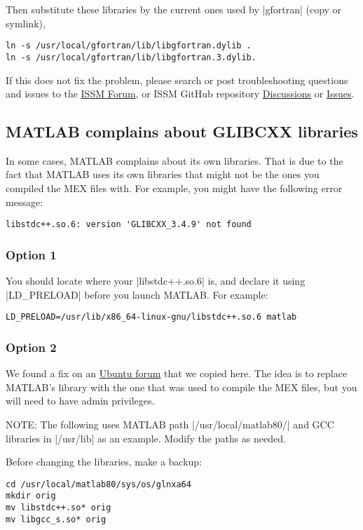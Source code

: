 Then substitute these libraries by the current ones used by \lstinlinebg|gfortran| (copy or symlink),
\begin{lstlisting}
ln -s /usr/local/gfortran/lib/libgfortran.dylib .
ln -s /usr/local/gfortran/lib/libgfortran.3.dylib.
\end{lstlisting}

If this does not fix the problem, please search or post troubleshooting questions and issues to the \href{https://issm.ess.uci.edu/forum/}{ISSM Forum}, or ISSM GitHub repository \href{https://github.com/ISSMteam/ISSM/discussions}{Discussions} or \href{https://github.com/ISSMteam/ISSM/issues}{Issues}.

\subsection*{MATLAB complains about GLIBCXX libraries}%
In some cases, MATLAB complains about its own libraries. That is due to the fact that MATLAB uses its own libraries that might not be the ones you compiled the MEX files with. For example, you might have the following error message:
\begin{lstlisting}
libstdc++.so.6: version 'GLIBCXX_3.4.9' not found
\end{lstlisting}

\subsubsection{Option 1}
You should locate where your \lstinlinebg|libstdc++.so.6| is, and declare it using \lstinlinebg|LD_PRELOAD| before you launch MATLAB. For example:
\begin{lstlisting}
LD_PRELOAD=/usr/lib/x86_64-linux-gnu/libstdc++.so.6 matlab
\end{lstlisting}

\subsubsection{Option 2}
We found a fix on an \href{http://ubuntuforums.org/showthread.php?t=808045}{Ubuntu forum} that we copied here. The idea is to replace MATLAB's library with the one that was used to compile the MEX files, but you will need to have admin privileges.

NOTE: The following uses MATLAB path \lstinlinebg|/usr/local/matlab80/| and GCC libraries in \lstinlinebg|/usr/lib| as an example. Modify the paths as needed.

Before changing the libraries, make a backup:
\begin{lstlisting}
cd /usr/local/matlab80/sys/os/glnxa64
mkdir orig
mv libstdc++.so* orig
mv libgcc_s.so* orig
\end{lstlisting}


